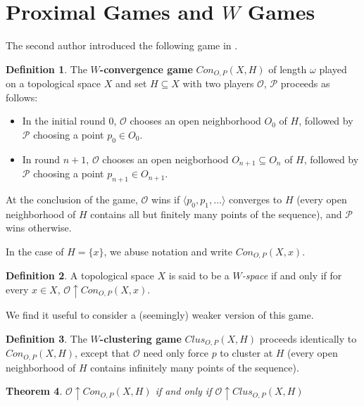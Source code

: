 \documentclass{amsart}
\newtheorem{thm}{Theorem}[section]
\theoremstyle{definition}
\newtheorem{defn}[thm]{Definition}
\theoremstyle{remark}
\newcommand{\<}{\langle}
\renewcommand{\>}{\rangle}
\newcommand{\congame}[2]{Con_{O,P}(#1,#2)}
\newcommand{\clusgame}[2]{Clus_{O,P}(#1,#2)}
\newcommand{\pl}[1]{\mathscr{#1}}
\newcommand{\win}{\uparrow}
\newcommand{\term}{\textit}
\begin{document}
\section{Proximal Games and $W$ Games}

The second author introduced the following game in \cite{ginfinite}.

\begin{defn}
  The \textbf{$W$-convergence game} $\congame{X}{H}$ of length $\omega$ played on a topological space $X$ and set $H\subseteq X$ with two players $\pl O$, $\pl P$ proceeds as follows:
    \begin{itemize}
      \item In the initial round $0$, $\pl O$ chooses an open neighborhood $O_0$ of $H$, followed by $\pl P$ choosing a point $p_0\in O_0$.
      \item In round $n+1$, $\pl O$ chooses an open neigborhood $O_{n+1}\subseteq O_n$ of $H$, followed by $\pl P$ choosing a point $p_{n+1}\in O_{n+1}$.
    \end{itemize}
  At the conclusion of the game, $\pl O$ wins if $\<p_0,p_1,\dots\>$ converges to $H$ (every open neighborhood of $H$ contains all but finitely many points of the sequence), and $\pl P$ wins otherwise.

  In the case of $H=\{x\}$, we abuse notation and write $\congame{X}{x}$.
\end{defn}

\begin{defn}
  A topological space $X$ is said to be a \term{$W$-space} if and only if for every $x\in X$, $\pl O\win \congame{X}{x}$.
\end{defn}

We find it useful to consider a (seemingly) weaker version of this game.

\begin{defn}
  The \textbf{$W$-clustering game} $\clusgame{X}{H}$ proceeds identically to $\congame{X}{H}$, except that $\pl O$ need only force $p$ to cluster at $H$ (every open neighborhood of $H$ contains infinitely many points of the sequence).
\end{defn}

\begin{thm}
  $\pl O\win\congame{X}{H}$ if and only if $\pl O \win\clusgame{X}{H}$
\end{thm}
\end{document}
